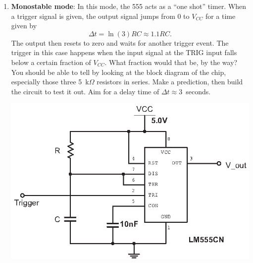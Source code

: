 \begin{enumerate}[wide]
\pagebreak[4]
\item \textbf{Monostable mode}: In this mode, the 555 acts as a ``one shot'' timer.  When a trigger signal is given, the output signal jumps from 0 to $V_{CC}$ for a time given by 
$$\Delta t = \ln (3) RC \approx 1.1 RC.$$
The output then resets to zero and waits for another trigger event.  The trigger in this case happens when the input signal at the TRIG input falls below a certain fraction of $V_{CC}$.  What fraction would that be, by the way?  You should be able to tell by looking at the block diagram of the chip, especially those three 5~k$\Omega$ resistors in series.  Make a prediction, then build the circuit to test it out.  Aim for a delay time of $\Delta t \approx 3$~seconds. \label{part_one_shot_timer}
\begin{center}
\includegraphics{timers/monostable_555.eps}
\end{center}


\end{enumerate}
